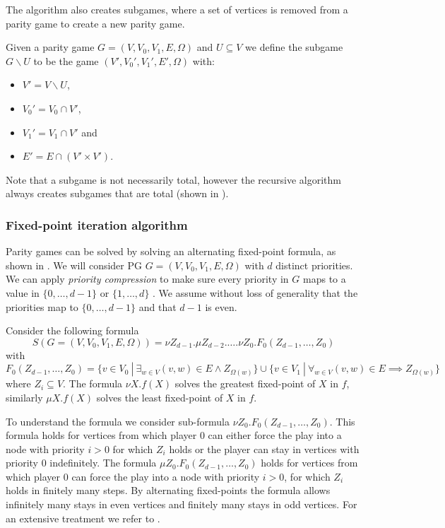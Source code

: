 The algorithm also creates subgames, where a set of vertices is removed from a parity game to create a new parity game.

\begin{definition}\cite{ZIELONKA1998135}
	\label{def_org_subgame}
	Given a parity game $G = (V,V_0,V_1, E,\Omega)$ and $U \subseteq V$ we define the subgame $G \backslash U$ to be the game $(V', V_0', V_1', E', \Omega)$ with:
	\begin{itemize}
		\item $V' = V \backslash U$,
		\item $V_0' = V_0 \cap V'$,
		\item $V_1' = V_1 \cap V'$ and
		\item $E' = E \cap (V' \times V')$.
	\end{itemize}
\end{definition}

Note that a subgame is not necessarily total, however the recursive algorithm always creates subgames that are total (shown in \cite{ZIELONKA1998135}).

\subsubsection{Fixed-point iteration algorithm}
Parity games can be solved by solving an alternating fixed-point formula, as shown in \cite{WALUKIEWICZ2002311}. We will consider PG $G = (V,V_0,V_1, E, \Omega)$ with $d$ distinct priorities. We can apply \textit{priority compression} to make sure every priority in $G$ maps to a value in $\{0,\dots,d-1\}$ or $\{1, \dots, d\}$ \cite{SolvingInPractice,FPITE}. We assume without loss of generality that the priorities map to $\{0,\dots,d-1\}$ and that $d-1$ is even. 

Consider the following formula
\[ S(G = (V,V_0,V_1,E,\Omega)) = \nu Z_{d-1}. \mu Z_{d-2}. \dots . \nu Z_0. F_0(Z_{d-1},\dots,Z_0) \]
with
\[ F_0(Z_{d-1},\dots,Z_0) = \{ v \in V_0\ |\ \exists_{w\in V} (v,w) \in E \wedge Z_{\Omega(w)} \} \cup \{ v \in V_1\ |\ \forall_{w\in V} (v,w) \in E \implies Z_{\Omega(w)} \} \]
where $Z_i \subseteq V$. The formula $\nu X. f(X)$ solves the greatest fixed-point of $X$ in $f$, similarly $\mu X.f(X)$ solves the least fixed-point of $X$ in $f$.

To understand the formula we consider sub-formula $\nu Z_0. F_0(Z_{d-1},\dots,Z_0)$. This formula holds for vertices from which player $0$ can either force the play into a node with priority $i > 0$ for which $Z_i$ holds or the player can stay in vertices with priority $0$ indefinitely. The formula $\mu Z_0. F_0(Z_{d-1},\dots,Z_0)$ holds for vertices from which player $0$ can force the play into a node with priority $i > 0$, for which $Z_i$ holds in finitely many steps. By alternating fixed-points the formula allows infinitely many stays in even vertices and finitely many stays in odd vertices. For an extensive treatment we refer to \cite{WALUKIEWICZ2002311}.

